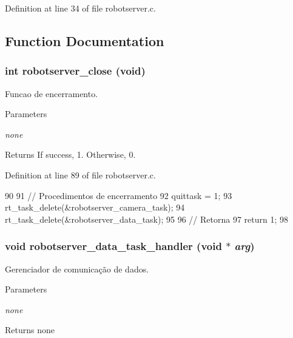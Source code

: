 Definition at line 34 of file robotserver.c.

\subsection{Function Documentation}
\subsubsection[{robotserver\_\-close}]{\setlength{\rightskip}{0pt plus 5cm}int robotserver\_\-close (void)}\label{robotserver_8c_a03604797e6b7e5fa2bb9dec674d34548}


Funcao de encerramento. 
\begin{DoxyParams}{Parameters}
\item[{\em none}]\end{DoxyParams}
\begin{DoxyReturn}{Returns}
If success, 1. Otherwise, 0. 
\end{DoxyReturn}


Definition at line 89 of file robotserver.c.


\begin{DoxyCode}
90 {
91         // Procedimentos de encerramento
92         quittask = 1;   
93         rt_task_delete(&robotserver_camera_task);       
94         rt_task_delete(&robotserver_data_task); 
95                 
96         // Retorna 
97     return 1; 
98 }                      
\end{DoxyCode}
\subsubsection[{robotserver\_\-data\_\-task\_\-handler}]{\setlength{\rightskip}{0pt plus 5cm}void robotserver\_\-data\_\-task\_\-handler (void $\ast$ {\em arg})}\label{robotserver_8c_afd14bee893e81d73d48dcc6edabf72a9}


Gerenciador de comunicação de dados. 
\begin{DoxyParams}{Parameters}
\item[{\em none}]\end{DoxyParams}
\begin{DoxyReturn}{Returns}
none 
\end{DoxyReturn}


